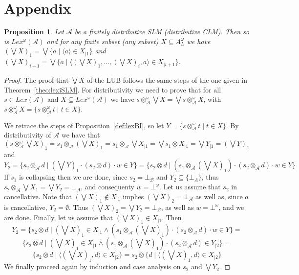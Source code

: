 \documentclass[a4paper]{elsarticle}
\newtheorem{proposition}{Proposition}
\newcommand{\1}{\mathbf{1}}
\begin{document}
\section*{Appendix}
\begin{proposition}\label{prop:lexiSLM}
	Let $\mathcal{A}$ be a finitely distributive SLM (distributive CLM).
	Then so is $Lex^\omega(\mathcal{A})$
	and for any finite subset (any subset) $X \subseteq A^\omega_L$ 
	we have $(\bigvee X)_1 = \bigvee \{ a \mid \langle a \rangle \in X_{\mid 1}\}$
	and $(\bigvee X)_{i+1} = \bigvee \{ a \mid \langle (\bigvee X)_1, \ldots, (\bigvee X)_i, a \rangle \in X_{\mid i+1}\}$.
\end{proposition}
\begin{proof}
	The proof that $\bigvee X$ of the LUB follows the same steps of the one given in Theorem~\ref{theo:lexiSLM}.
	For distributivity we need to prove that for all $s \in Lex(\mathcal{A})$ and 
	$X \subseteq Lex^\omega(\mathcal{A})$ we have $s \otimes^\omega_\mathcal{A} \bigvee X = \bigvee s \otimes^\omega_\mathcal{A} X$, 
	with $s \otimes^\omega_\mathcal{A} X = \{ s \otimes^\omega_\mathcal{A} t \mid t \in X\}$.
	
	We retrace the steps of Proposition~\ref{def:lexBI}, so let $Y = \{ s \otimes^\omega_\mathcal{A} t \mid t \in X\}$.
	By distributivity of $\mathcal{A}$ we have that
	$(s \otimes^\omega_\mathcal{A} \bigvee X)_1 = s_1 \otimes_\mathcal{A} (\bigvee X)_1 = s_1 \otimes_\mathcal{A} \bigvee X_{\mid 1}
	= \bigvee s_1 \otimes X_{\mid 1} =  \bigvee Y_{\mid 1} = (\bigvee Y)_1$ and
	$$Y_2 = \{ s_2 \otimes_\mathcal{A} d \mid (\bigvee Y)_{1} \cdot (s_2 \otimes d) \cdot w \in Y\}
	= \{  s_2 \otimes d \mid (s_1 \otimes_\mathcal{A} (\bigvee X)_{1}) \cdot (s_2 \otimes_\mathcal{A} d) \cdot w \in Y \}$$
	If $s_1$ is collapsing then we are done, since $s_2 = \bot_\mathcal{B}$ and $Y_2 \subseteq \{\bot_{A}\}$,
	thus $s_2 \otimes_\mathcal{A} \bigvee X_1 = 
	\bigvee Y_2 = \bot_{A}$, and consequenty $w = \bot^\omega$.
	Let us assume that $s_2$ in cancellative.
	Note that $(\bigvee X)_1 \not \in X_{\mid 1}$ implies $(\bigvee X)_2 = \bot_{\mathcal A}$ as well as, 
	since $a$ is cancellative, $Y_2 = \emptyset$.
	Thus $(\bigvee X)_2 = \bigvee Y_2 =\bot_\mathcal{B}$, as well as 
	$w = \bot^\omega$, and we are done.
	Finally, let us assume that $(\bigvee X)_1 \in X_{\mid 1}$. Then
	$$Y_2 = \{  s_2 \otimes d \mid (\bigvee X)_1 \in X_{\mid 1} \wedge (s_1 \otimes_\mathcal{A} (\bigvee X)_{1}) \cdot (s_2 \otimes_\mathcal{A} d) \cdot w \in Y \}
	=  $$
	$$\{  s_2 \otimes d \mid (\bigvee X)_1 \in X_{\mid 1} \wedge (s_1 \otimes_\mathcal{A} (\bigvee X)_{1}) \cdot (s_2 \otimes_\mathcal{A} d) \in Y _{\mid 2} \}
	=$$
	$$\{  s_2 \otimes d \mid \langle (\bigvee X)_1, d \rangle \in X _{\mid 2} \}
	= s_2 \otimes \{ d \mid \langle (\bigvee X)_1,  d \rangle \in X _{\mid 2} \}$$
	We finally proceed again by induction and case analysis on $s_2$ and $\bigvee Y_2$.
\end{proof}
\end{document}
